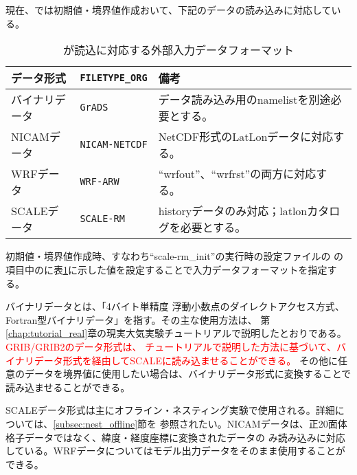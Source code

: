 \section{\SecAdvanceInputDataSetting} \label{sec:adv_datainput}

現在、\scalerm では初期値・境界値作成おいて、下記のデータの読み込みに対応している。

\begin{table}[htb]
\begin{center}
\caption{\scalelib が読込に対応する外部入力データフォーマット}
\begin{tabularx}{150mm}{|l|l|X|} \hline
 \rowcolor[gray]{0.9} データ形式 & \verb|FILETYPE_ORG| & 備考 \\ \hline
 バイナリデータ & \verb|GrADS| & データ読み込み用のnamelistを別途必要とする。 \\ \hline
 NICAMデータ &  \verb|NICAM-NETCDF| & NetCDF形式のLatLonデータに対応する。 \\ \hline
 WRFデータ &  \verb|WRF-ARW| & ``wrfout''、``wrfrst''の両方に対応する。 \\ \hline
 SCALEデータ &  \verb|SCALE-RM| & historyデータのみ対応；latlonカタログを必要とする。 \\ \hline
\end{tabularx}
\label{tab:inputdata_format}
\end{center}
\end{table}

初期値・境界値作成時、すなわち``scale-rm\_init''の実行時の設定ファイルの
の項目中のに表\ref{tab:inputdata_format}に示した値を設定することで入力データフォーマットを指定する。

バイナリデータとは、「4バイト単精度
浮動小数点のダイレクトアクセス方式、Fortran型バイナリデータ」を指す。その主な使用方法は、
第\ref{chap:tutorial_real}章の現実大気実験チュートリアルで説明したとおりである。\textcolor{red}{GRIB/GRIB2のデータ形式は、
チュートリアルで説明した方法に基づいて、バイナリデータ形式を経由してSCALEに読み込ませることができる。}
その他に任意のデータを境界値に使用したい場合は、バイナリデータ形式に変換することで読み込ませることができる。

SCALEデータ形式は主にオフライン・ネスティング実験で使用される。詳細については、\ref{subsec:nest_offline}節を
参照されたい。NICAMデータは、正20面体格子データではなく、緯度・経度座標に変換されたデータの
み読み込みに対応している。WRFデータについてはモデル出力データをそのまま使用することができる。

